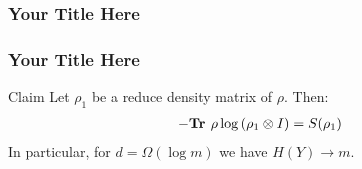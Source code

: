 \documentclass{beamer}
\begin{document}
\begin{frame}
  \frametitle{Your Title Here}
\end{frame}
\begin{frame}
  \frametitle{Your Title Here}
  
\begin{block}{Claim}
  Let $\rho_{1}$ be a reduce density matrix of $\rho$. Then:  
  \begin{equation*}
    \begin{split}
      - \textbf{Tr } \rho \log \left( \rho_{1} \otimes I \right)= S(\rho_{1})
    \end{split}
  \end{equation*}
  In particular, for $d = \Omega(\log m)$ we have $H(Y) \rightarrow m$. 


\end{block}
\end{frame}
\end{document}
